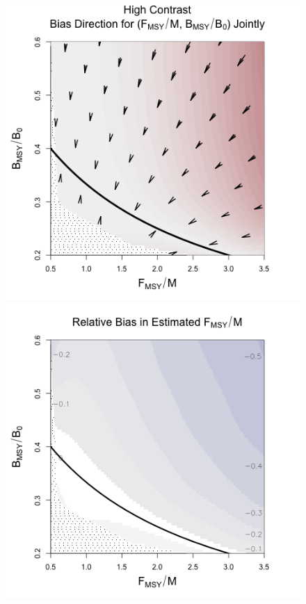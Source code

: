 \begin{figure}[h!]
\begin{minipage}[h!]{0.44\textwidth}
\includegraphics[width=1.2\textwidth]{../gpBias/directionalBiasSchnuteSubTitleExpT45N150Wide.png}\\
\hspace*{-0.1cm}
\includegraphics[width=1.2\textwidth]{../gpBias/fMSYRelBiasSchnuteExpT45N150Wide.png}

\end{minipage}
\end{figure}
